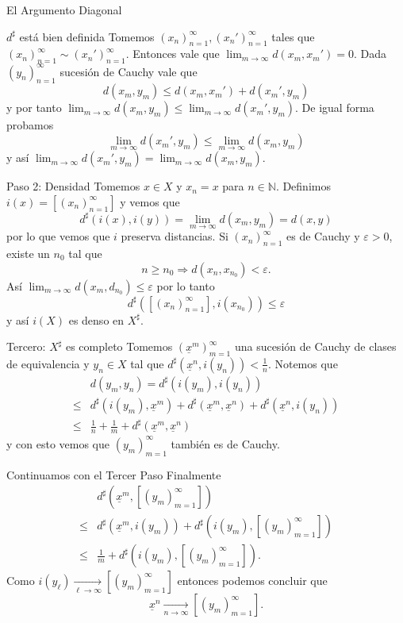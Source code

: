\documentclass[utf8]{beamer}
\theoremstyle{plain}
\theoremstyle{definition}
\theoremstyle{remark}
\numberwithin{equation}{section}
\newcommand{\eps}{\varepsilon}          %
\newcommand{\bN}{\mathbb{N}}    %
\renewcommand{\geq}{\geqslant}          %
\renewcommand{\l}{\ell}                   %
\renewcommand{\leq}{\leqslant}          %
\newcommand{\To}{\Rightarrow}
\newcommand{\un}{\underline}
\newcommand{\sucm}{_{m=1}^\infty} %
\newcommand{\sucn}{_{n=1}^\infty} %
\begin{document}
\begin{frame}{El Argumento Diagonal}
\end{frame}


\begin{frame}{$d^\sharp$ está bien definida}
Tomemos $(x_n)\sucn,(x_n')\sucn$ tales que $(x_n)\sucn\sim(x_n')\sucn$. Entonces vale que $\lim_{m\to\infty}d(x_m,x_m')=0$. Dada $(y_n)\sucn$ sucesión de Cauchy vale que
$$d(x_m,y_m)\leq d(x_m,x_m')+d(x_m',y_m)$$
y por tanto $\lim_{m\to\infty}d(x_m,y_m)\leq\lim_{m\to\infty}d(x_m',y_m)$. De igual forma probamos 
$$\lim_{m\to\infty}d(x_m',y_m)\leq\lim_{m\to\infty}d(x_m,y_m)$$
y así $\lim_{m\to\infty}d(x_m',y_m)=\lim_{m\to\infty}d(x_m,y_m)$.
\end{frame}

\begin{frame}{Paso 2: Densidad}
  Tomemos $x\in X$ y $x_n=x$ para $n\in\bN$. Definimos $i(x)=[(x_n)\sucn]$ y vemos que 
  $$d^\sharp(i(x),i(y))=\lim_{m\to\infty}d(x_m,y_m)=d(x,y)$$
  por lo que vemos que $i$ preserva distancias. Si $(x_n)\sucn$ es de Cauchy y $\eps>0$, existe un $n_0$ tal que 
  $$n\geq n_0\To d(x_n,x_{n_0})<\eps.$$
  Así $\lim_{m\to\infty}d(x_m,d_{n_0})\leq\eps$ por lo tanto 
  $$d^\sharp([(x_n)\sucn],i(x_{n_0}))\leq\eps$$
  y así $i(X)$ es denso en $X^\sharp$.
\end{frame}

\begin{frame}{Tercero: $X^\sharp$ es completo}
Tomemos $(\un x^m)\sucm$ una sucesión de Cauchy de clases de equivalencia y $y_n\in X$ tal que $d^\sharp(\un x^n,i(y_n))<\frac1n$. Notemos que
\begin{align*}
  &d(y_m,y_n)=d^\sharp(i(y_m),i(y_n))\\
  \leq&d^\sharp(i(y_m),\un x^m)+d^\sharp(\un x^m,\un x^n)+d^\sharp(\un x^n,i(y_n))\\
  \leq&\frac 1n+\frac1m+d^\sharp(\un x^m,\un x^n)
\end{align*}  
y con esto vemos que $(y_m)\sucm$ también es de Cauchy.
\end{frame}

\begin{frame}{Continuamos con el Tercer Paso}
Finalmente
\begin{align*}
  &d^\sharp(\un x^m,[(y_m)\sucm])\\
\leq& d^\sharp(\un x^m,i(y_m))+d^\sharp(i(y_m),[(y_m)\sucm])\\
\leq & \frac{1}{m}+d^\sharp(i(y_m),[(y_m)\sucm]).
\end{align*}  
Como $i(y_\l)\xrightarrow[\l\to\infty]{}[(y_m)\sucm]$ entonces podemos concluir que 
$$\un x^n\xrightarrow[n\to\infty]{}[(y_m)\sucm].$$
\end{frame}
\end{document}
